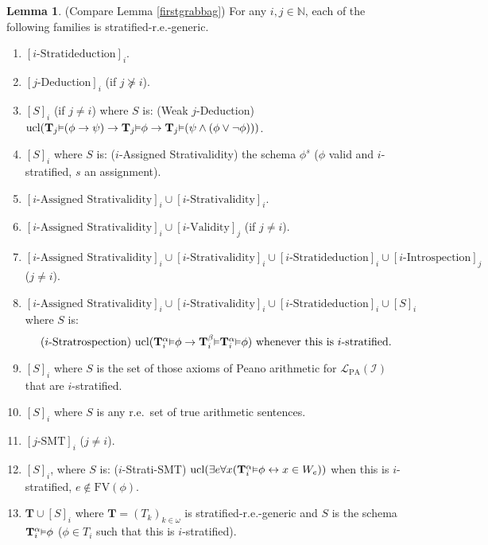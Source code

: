 \documentclass[reqno]{article}
\theoremstyle{definition}
\newtheorem{lemma}[theorem]{Lemma}
\def\N{\mathbb{N}}
\def\L{\mathscr{L}}
\def\T{\mathbf{T}}
\def\FV{\mathrm{FV}}
\def\LPA{\L_{\mathrm{PA}}}
\def\indset{\mathcal I}
\renewcommand{\Pr}[1]{\T_{#1}\mbox{\small${\vDash}$}}
\newcommand{\Prr}[2]{\T^{#1}_{#2}\mbox{\small${\vDash}$}}
\newcommand{\ucl}[1]{\mathrm{ucl}(#1)}
\begin{document}
\begin{lemma}
\label{secondgrabbag}
(Compare Lemma \ref{firstgrabbag})
For any $i,j\in\N$, each of the following families
is stratified-r.e.-generic.
\begin{enumerate}
\item $[\mbox{$i$-Stratideduction}]_i$.
\item $[\mbox{$j$-Deduction}]_i$ (if $j\not\succeq i$).
\item $[S]_i$ (if $j\not=i$) where $S$ is: (Weak $j$-Deduction) $\ucl{\Pr j(\phi\rightarrow\psi)\rightarrow\Pr j\phi\rightarrow \Pr 
j(\psi\wedge(\phi\vee\neg\phi))}$.
\item $[S]_i$ where $S$ is: ($i$-Assigned Strativalidity)
the schema $\phi^s$ ($\phi$ valid and $i$-stratified, $s$ an assignment).
\item $[\mbox{$i$-Assigned Strativalidity}]_i \cup [\mbox{$i$-Strativalidity}]_i$.
\item $[\mbox{$i$-Assigned Strativalidity}]_i \cup
[\mbox{$i$-Validity}]_j$ (if $j\not=i$).
\item $[\mbox{$i$-Assigned Strativalidity}]_i \cup [\mbox{$i$-Strativalidity}]_i \cup [\mbox{$i$-Stratideduction}]_i
\cup [\mbox{$i$-Introspection}]_j$ ($j\not=i$).
\item $[\mbox{$i$-Assigned Strativalidity}]_i \cup [\mbox{$i$-Strativalidity}]_i \cup [\mbox{$i$-Stratideduction}]_i
\cup [S]_i$ where $S$ is:
\[\mbox{($i$-Stratrospection) $\ucl{\Prr\alpha i\phi\rightarrow \Prr\beta 
i\Prr\alpha i\phi}$
whenever this is $i$-stratified.}\]
\item $[S]_i$ where $S$ is the set of those axioms of Peano arithmetic for 
$\LPA(\indset)$ that are $i$-stratified.
\item $[S]_i$ where $S$ is any r.e.~set of true arithmetic sentences.
\item $[\mbox{$j$-SMT}]_i$ ($j\not=i$).
\item $[S]_i$, where $S$ is: ($i$-Strati-SMT)
$\ucl{\exists e\forall x(\Prr\alpha i\phi\leftrightarrow x\in W_e)}$
when this is $i$-stratified, $e\not\in\FV(\phi)$.
%
%
\item $\T\cup [S]_i$ where $\T=(T_k)_{k\in\omega}$ is stratified-r.e.-generic
and $S$ is the schema $\Prr\alpha i\phi$ ($\phi\in T_i$ such that this is $i$-stratified).
\end{enumerate}
\end{lemma}
\end{document}
